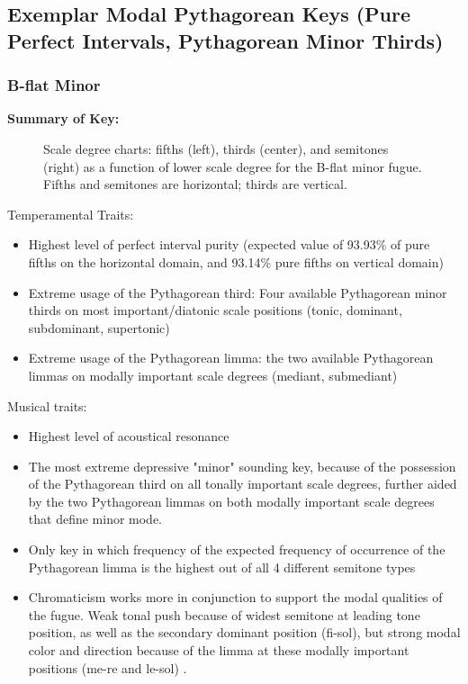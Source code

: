     \subsection{Exemplar Modal Pythagorean Keys (Pure Perfect Intervals,
Pythagorean Minor
Thirds)}\label{exemplar-modal-pythagorean-keys-pure-perfect-intervals-pythagorean-minor-thirds}

    \subsubsection{B-flat Minor}\label{b-flat-minor}

\textbf{Summary of Key:}



\begin{figure}[H]
\vspace{1.5em}
    \centering
    \caption[Scale degree charts: fifths, thirds, and semitones as a function of lower scale degree for the B-flat minor fugue. ]{Scale degree charts: fifths (left), thirds (center), and semitones (right) as a function of lower scale degree for the B-flat minor fugue. Fifths and semitones are horizontal; thirds are vertical.}
\end{figure}    Temperamental Traits:

\begin{itemize}
\tightlist
\item
  Highest level of perfect interval purity (expected value of 93.93\% of
  pure fifths on the horizontal domain, and 93.14\% pure fifths on
  vertical domain)
\item
  Extreme usage of the Pythagorean third: Four available Pythagorean
  minor thirds on most important/diatonic scale positions (tonic,
  dominant, subdominant, supertonic)
\item
  Extreme usage of the Pythagorean limma: the two available Pythagorean
  limmas on modally important scale degrees (mediant, submediant)
\end{itemize}

Musical traits:

\begin{itemize}
\tightlist
\item
  Highest level of acoustical resonance
\item
  The most extreme depressive "minor" sounding key, because of the
  possession of the Pythagorean third on all tonally important scale
  degrees, further aided by the two Pythagorean limmas on both modally
  important scale degrees that define minor mode.
\item
  Only key in which frequency of the expected frequency of occurrence of
  the Pythagorean limma is the highest out of all 4 different semitone
  types
\item
  Chromaticism works more in conjunction to support the modal qualities
  of the fugue. Weak tonal push because of widest semitone at leading
  tone position, as well as the secondary dominant position (fi-sol),
  but strong modal color and direction because of the limma at these
  modally important positions (me-re and le-sol) .
\end{itemize}


